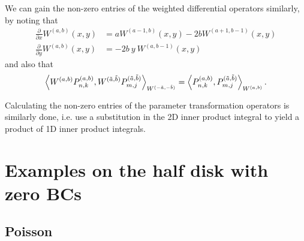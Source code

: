 \documentclass[11pt, oneside]{article}   	%
\newcommand{\pddx}{\frac{\partial}{\partial x}}
\newcommand{\pddy}{\frac{\partial}{\partial y}}
\newcommand{\Pnkab}{P_{n,k}^{(a,b)}}
\newcommand{\Wab}{{W^{(a,b)}}}
\begin{document}
We can gain the non-zero entries of the weighted differential operators similarly, by noting that
\begin{align}
	\pddx \Wab(x,y) &= a W^{(a-1, b)}(x,y) - 2bW^{(a+1, b-1)}(x,y) \\
	\pddy \Wab(x,y) &= -2b \: y \: W^{(a, b-1)}(x,y)
\end{align}
and also that
\begin{align}
	\ip< \Wab \Pnkab, W^{(\tilde{a},\tilde{b})} P^{(\tilde{a},\tilde{b})}_{m,j} >_{W^{(-\tilde{a},-\tilde{b})}} = \ip< \Pnkab, P^{(\tilde{a},\tilde{b})}_{m,j} >_\Wab.
\end{align}

Calculating the non-zero entries of the parameter transformation operators is similarly done, i.e. use a substitution in the 2D inner product integral to yield a product of 1D inner product integrals. 


%
\section{Examples on the half disk with zero BCs}\label{Section:Examples}


\subsection{Poisson}
\end{document}
